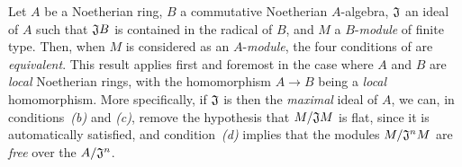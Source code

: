 \begin{env}[10.2.2]
\label{0.10.2.2}
Let $A$ be a Noetherian ring, $B$ a commutative Noetherian $A$-algebra, $\mathfrak{J}$ an ideal of $A$ such that $\mathfrak{J}B$ is contained in the radical of $B$, and $M$ a $B$-\emph{module} of finite type.
Then, when $M$ is considered as an $A$-\emph{module}, the four conditions of  are \emph{equivalent}.
This result applies first and foremost in the case where $A$ and $B$ are \emph{local} Noetherian rings, with the homomorphism $A\to B$ being a \emph{local} homomorphism.
More specifically, if $\mathfrak{J}$ is then the \emph{maximal} ideal of $A$, we can, in conditions~\emph{(b)} and \emph{(c)}, remove the hypothesis that $M/\mathfrak{J}M$ is flat, since it is automatically satisfied, and condition~\emph{(d)} implies that the modules $M/\mathfrak{J}^nM$ are \emph{free} over the $A/\mathfrak{J}^n$.
\end{env}

\begin{env}[10.2.3]
\label{0.10.2.3}
\end{env}
